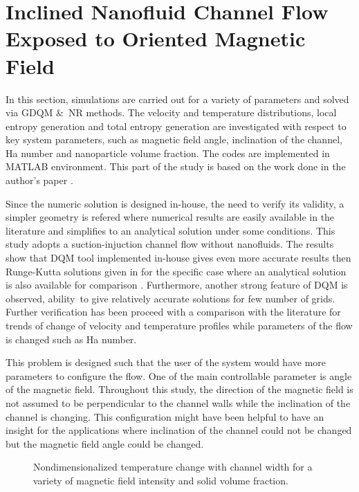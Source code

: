 \section{Inclined Nanofluid Channel Flow Exposed to Oriented Magnetic Field}

In this section, simulations are carried out for a variety of parameters and solved via GDQM \&~NR methods. The velocity and temperature distributions, local entropy generation and total entropy generation are investigated with respect to key system parameters, such as magnetic field angle, inclination of the channel, Ha number and nanoparticle volume fraction.  The codes are implemented in MATLAB environment. This part of the study is based on the work done in the author's paper \cite{baskaya2017investigation}.


Since the numeric solution is designed in-house, the need to verify its validity, a simpler geometry is refered where numerical results are easily available in the literature and simplifies to an analytical solution under some conditions. This study adopts a suction-injuction channel flow without nanofluids. The results show that DQM tool implemented in-house gives even more accurate results then Runge-Kutta solutions given in  \cite{eegunjobi2013entropy} for the specific case where an analytical solution is also available for comparison \cite{bacskaya2014analysis}. Furthermore, another strong feature of DQM is observed, ability~to give relatively accurate solutions for few number of grids.
Further verification has been proceed with a comparison with the literature for trends of change of velocity and temperature profiles while parameters of the flow is changed such as Ha number.


This problem is designed such that the user of the system would have more parameters to configure the flow.
One of the main controllable parameter is angle of the magnetic field. Throughout this study, the direction of the magnetic field is not assumed to be perpendicular to the channel walls while the inclination of the channel is changing. This configuration might have been helpful to have an insight for the applications where inclination of the channel could not be changed but the magnetic field angle could be changed.  



\begin{figure}
\centerline{}
\vspace*{5mm}
\caption{Nondimensionalized temperature change with channel width for a variety of magnetic field intensity and solid volume fraction.}
\label{tempDist} 
\end{figure}


